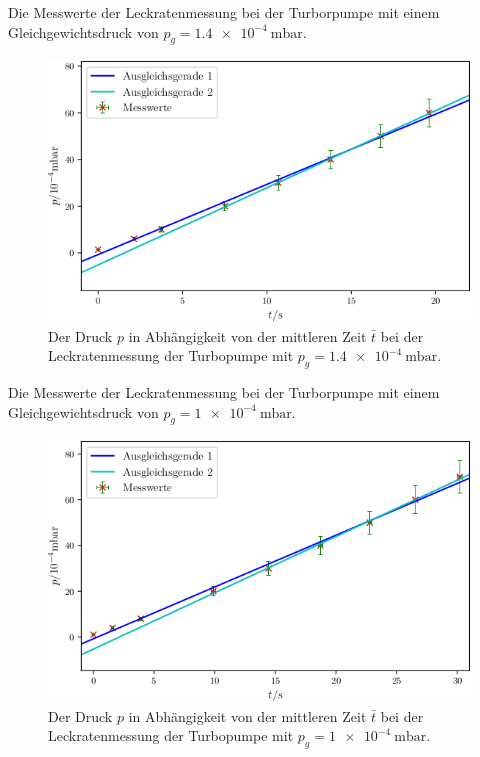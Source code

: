 \begin{table}
\centering
\caption{Die Messwerte der Leckratenmessung bei der Turborpumpe mit einem Gleichgewichtsdruck von $p_g = \SI{1.4e-4}{\milli\bar}$.}

\label{tab:TL2}
\end{table}

\begin{figure}
\centering
\includegraphics[width=\linewidth-70pt,height=\textheight-70pt,keepaspectratio]{content/images/TL2.png}
\caption{Der Druck $p$ in Abhängigkeit von der mittleren Zeit $\bar{t}$ bei der Leckratenmessung der Turbopumpe  mit $p_g = \SI{1.4e-4}{\milli\bar}$.}
\label{fig:TL2}
\end{figure}

\begin{table}
\centering
\caption{Die Messwerte der Leckratenmessung bei der Turborpumpe mit einem Gleichgewichtsdruck von $p_g = \SI{1e-4}{\milli\bar}$.}

\label{tab:TL3}
\end{table}

\begin{figure}
\centering
\includegraphics[width=\linewidth-70pt,height=\textheight-70pt,keepaspectratio]{content/images/TL3.png}
\caption{Der Druck $p$ in Abhängigkeit von der mittleren Zeit $\bar{t}$ bei der Leckratenmessung der Turbopumpe  mit $p_g = \SI{1e-4}{\milli\bar}$.}
\label{fig:TL3}
\end{figure}

